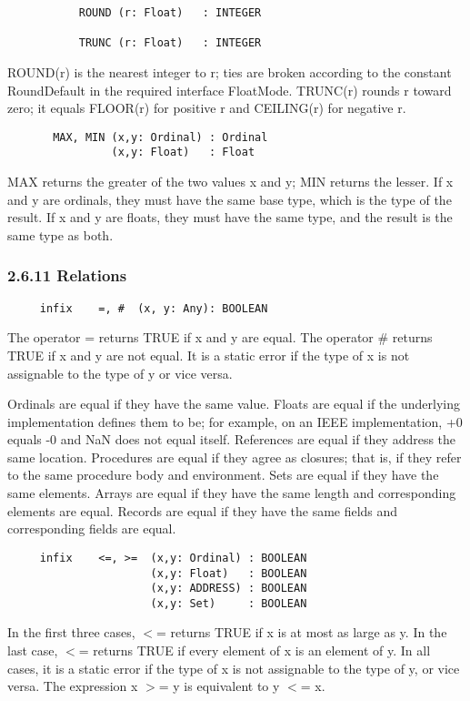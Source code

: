 \documentclass[10pt]{article}
\begin{document}
\begin{verbatim}
           ROUND (r: Float)   : INTEGER

           TRUNC (r: Float)   : INTEGER
\end{verbatim}
ROUND(r) is the nearest integer to r; ties are broken according to the
constant RoundDefault in the required interface FloatMode. TRUNC(r) rounds r
toward zero; it equals FLOOR(r) for positive r and CEILING(r) for negative r.

\begin{verbatim}
       MAX, MIN (x,y: Ordinal) : Ordinal
                (x,y: Float)   : Float
\end{verbatim}
MAX returns the greater of the two values x and y; MIN returns the lesser. If
x and y are ordinals, they must have the same base type, which is the type of
the result. If x and y are floats, they must have the same type, and the
result is the same type as both.

\subsubsection*{2.6.11 Relations}

\begin{verbatim}
     infix    =, #  (x, y: Any): BOOLEAN
\end{verbatim}
The operator = returns TRUE if x and y are equal. The operator \# returns TRUE
if x and y are not equal. It is a static error if the type of x is not
assignable to the type of y or vice versa.

Ordinals are equal if they have the same value. Floats are equal if the
underlying implementation defines them to be; for example, on an IEEE
implementation, +0 equals -0 and NaN does not equal itself. References are
equal if they address the same location. Procedures are equal if they agree as
closures; that is, if they refer to the same procedure body and
environment. Sets are equal if they have the same elements. Arrays are equal
if they have the same length and corresponding elements are equal. Records are
equal if they have the same fields and corresponding fields are equal.

\begin{verbatim}
     infix    <=, >=  (x,y: Ordinal) : BOOLEAN
                      (x,y: Float)   : BOOLEAN
                      (x,y: ADDRESS) : BOOLEAN
                      (x,y: Set)     : BOOLEAN
\end{verbatim}
In the first three cases, $<$= returns TRUE if x is at most as large as y. In
the last case, $<$= returns TRUE if every element of x is an element of y. In
all cases, it is a static error if the type of x is not assignable to the type
of y, or vice versa. The expression x $>$= y is equivalent to y $<$= x.
\end{document}
